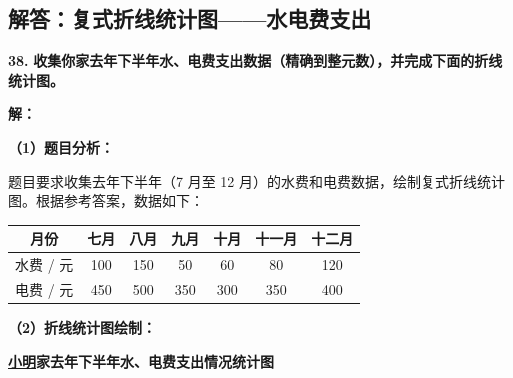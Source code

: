 \newpage

\newpage

\subsection{解答：复式折线统计图——水电费支出}

\vspace{0.6cm}

\textbf{\LARGE 38.} \textbf{收集你家去年下半年水、电费支出数据（精确到整元数），并完成下面的折线统计图。}

\vspace{0.4cm}
\textbf{解：}

\textbf{（1）题目分析：}

题目要求收集去年下半年（7 月至 12 月）的水费和电费数据，绘制复式折线统计图。根据参考答案，数据如下：

\vspace{0.2cm}
\begin{center}
\renewcommand{\arraystretch}{1.5}
\begin{tabular}{c|c|c|c|c|c|c}
\toprule[1.2pt]
月份 & 七月 & 八月 & 九月 & 十月 & 十一月 & 十二月 \\
\hline
水费 / 元 & 100 & 150 & 50 & 60 & 80 & 120 \\
\hline
电费 / 元 & 450 & 500 & 350 & 300 & 350 & 400 \\
\bottomrule[1.2pt]
\end{tabular}
\end{center}

\vspace{0.4cm}
\textbf{（2）折线统计图绘制：}

\begin{center}
{\textbf{\large \underline{小明}家去年下半年水、电费支出情况统计图}}
\end{center}

